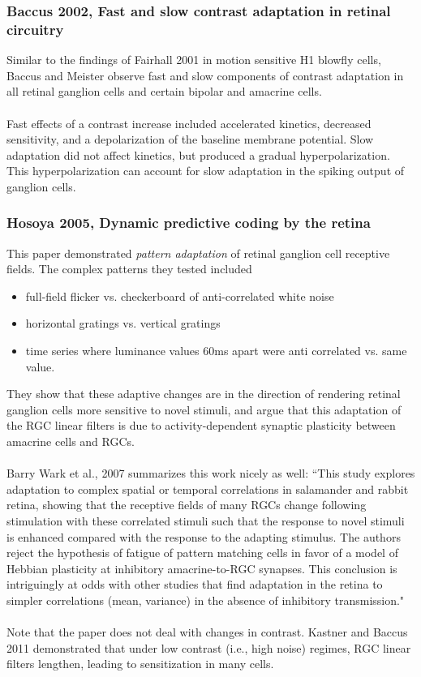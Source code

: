 \documentclass{article}
\begin{document}
\subsubsection{Baccus 2002, Fast and slow contrast adaptation in retinal circuitry}
Similar to the findings of Fairhall 2001 in motion sensitive H1 blowfly cells, Baccus and Meister observe fast and slow components of contrast adaptation in all retinal ganglion cells and certain bipolar and amacrine cells. \\
\\
Fast effects of a contrast increase included accelerated kinetics, decreased sensitivity, and a depolarization of the baseline membrane potential. Slow adaptation did not affect kinetics, but produced a gradual hyperpolarization. This hyperpolarization can account for slow adaptation in the spiking output of ganglion cells.


\subsubsection{Hosoya 2005, Dynamic predictive coding by the retina}
This paper demonstrated {\it pattern adaptation} of retinal ganglion cell receptive fields.  The complex patterns they tested included
\begin{itemize}
\item full-field flicker vs. checkerboard of anti-correlated white noise
\item horizontal gratings vs. vertical gratings
\item time series where luminance values 60ms apart were anti correlated vs. same value.
\end{itemize}
They show that these adaptive changes are in the direction of rendering retinal ganglion cells more sensitive to novel stimuli, and argue that this adaptation of the RGC linear filters is due to activity-dependent synaptic plasticity between amacrine cells and RGCs.\\
\\
Barry Wark et al., 2007 summarizes this work nicely as well:
``This study explores adaptation to complex spatial or temporal correlations in salamander and rabbit retina, showing that the receptive fields of many RGCs change following stimulation with these correlated stimuli such that the response to novel stimuli is enhanced compared with the response to the adapting stimulus. The authors reject the hypothesis of fatigue of pattern matching cells in favor of a model of Hebbian plasticity at inhibitory amacrine-to-RGC synapses. This conclusion is intriguingly at odds with other studies that find adaptation in the retina to simpler correlations (mean, variance) in the absence of inhibitory transmission." \\
\\
Note that the paper does not deal with changes in contrast.  Kastner and Baccus 2011 demonstrated that under low contrast (i.e., high noise) regimes, RGC linear filters lengthen, leading to sensitization in many cells.
\end{document}
